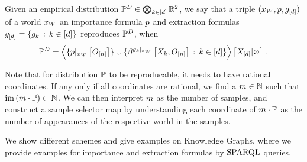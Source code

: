 \begin{definition}
    Given an empirical distribution $\mathbb{P}^{D}\in\bigotimes_{k\in[d]}\mathbb{R}^2$, we say that a triple $(x_{W},p,g_{[d]})$ of a \firstOrderLogic{} world $x_{W}$ an importance formula $p$ and extraction formulas $g_{[d]}=\{g_{k}\,:\,k\in[d]\}$ reproduces $\mathbb{P}^{D}$, when
    \begin{align*}
        \mathbb{P}^{D}
        = \left\langle \{{p}|_{x_{W}} \left[O_{[n]}\right]\}\cup
        \{\beta^{{g_{k}}|_{x_{W}}}\left[X_{k},O_{[n]}\right] \,:\, k\in[d]\}
        \right\rangle \left[ X_{[d]} | \varnothing \right] \, .
    \end{align*}
\end{definition}

Note that for distribution $\mathbb{P}$ to be reproducable, it needs to have rational coordinates. %
If any only if all coordinates are rational, we find a $m\in\mathbb{N}$ such that $\mathrm{im}\left(m\cdot\mathbb{P}\right)\subset\mathbb{N}$.
We can then interpret $m$ as the number of samples, and construct a sample selector map by understanding each coordinate of $m\cdot\mathbb{P}$ as the number of appearances of the respective world in the samples.

We show different schemes and give examples on Knowledge Graphs, where we provide examples for importance and extraction formulas by $\mathrm{SPARQL}$ queries.


%



